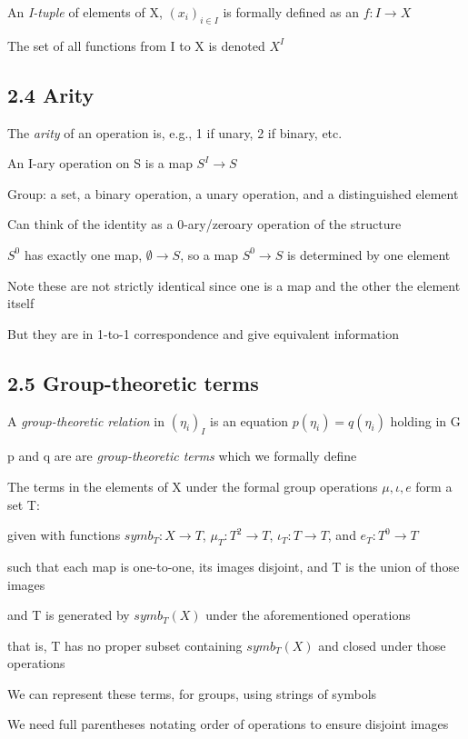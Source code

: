 \documentclass[12pt]{article}
\begin{document}
An \textit{I-tuple} of elements of X, $(x_i)_{i \in I}$ is formally defined as an $f: I \to X$

The set of all functions from I to X is denoted $X^I$

\subsection{2.4 Arity}

\noindent
The \textit{arity} of an operation is, e.g., 1 if unary, 2 if binary, etc.

An I-ary operation on S is a map $S^I \to S$

Group: a set, a binary operation, a unary operation, and a distinguished element

\noindent
Can think of the identity as a 0-ary/zeroary operation of the structure

$S^0$ has exactly one map, $\emptyset \to S$, so a map $S^0 \to S$ is determined by one element

Note these are not strictly identical since one is a map and the other the element itself

But they are in 1-to-1 correspondence and give equivalent information

\subsection{2.5 Group-theoretic terms}

\noindent
A \textit{group-theoretic relation} in $(\eta_i)_I$ is an equation $p(\eta_i) = q(\eta_i)$ holding in G

p and q are are \textit{group-theoretic terms} which we formally define

\noindent
The terms in the elements of X under the formal group operations $\mu, \iota, e$ form a set T:

given with functions $symb_T: X \to T$, $\mu_T: T^2 \to T$, $\iota_T: T \to T$, and $e_T: T^0 \to T$

such that each map is one-to-one, its images disjoint, and T is the union of those images

and T is generated by $symb_T(X)$ under the aforementioned operations

that is, T has no proper subset containing $symb_T(X)$ and closed under those operations

\noindent
We can represent these terms, for groups, using strings of symbols

We need full parentheses notating order of operations to ensure disjoint images
\end{document}
